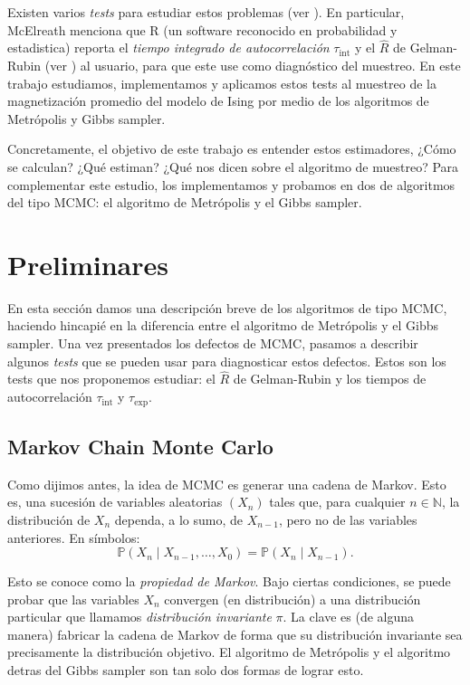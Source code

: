 \documentclass[a4paper, 12pt]{article}
\newcommand{\N}{\mathbb{N}}
\renewcommand{\P}{\mathbb{P}}
\newcommand{\tauint}{\tau_\text{int}}
\newcommand{\tauexp}{\tau_\text{exp}}
\begin{document}
Existen varios {\it tests} para estudiar estos problemas (ver \cite{vivekanada2020convergence, mcelreath2016statistical, schachinger2007mcmc}). En particular, McElreath menciona que R (un software reconocido en probabilidad y estadistica) reporta el {\it tiempo integrado de autocorrelación} $\tauint$ y el $\hat{R}$ de Gelman-Rubin (ver \cite{gelman1992inference, gelman2013bayesian}) al usuario, para que este use como diagnóstico del muestreo. En este trabajo estudiamos, implementamos y aplicamos estos tests al muestreo de la magnetización promedio del modelo de Ising por medio de los algoritmos de Metrópolis y Gibbs sampler.

\newpage

Concretamente, el objetivo de este trabajo es entender estos estimadores, ¿Cómo se calculan? ¿Qué estiman? ¿Qué nos dicen sobre el algoritmo de muestreo? Para complementar este estudio, los implementamos y probamos en dos de algoritmos del tipo MCMC: el algoritmo de Metrópolis y el Gibbs sampler.

\section{Preliminares}

En esta sección damos una descripción breve de los algoritmos de tipo MCMC, haciendo hincapié en la diferencia entre el algoritmo de Metrópolis y el Gibbs sampler. Una vez presentados los defectos de MCMC, pasamos a describir algunos {\it tests} que se pueden usar para diagnosticar estos defectos. Estos son los tests que nos proponemos estudiar: el $\hat{R}$ de Gelman-Rubin y los tiempos de autocorrelación $\tauint$ y $\tauexp$.

\subsection{Markov Chain Monte Carlo}

Como dijimos antes, la idea de MCMC es generar una cadena de Markov. Esto es, una sucesión de variables aleatorias $(X_n)$ tales que, para cualquier $n \in \N$, la distribución de $X_n$ dependa, a lo sumo, de $X_{n - 1}$, pero no de las variables anteriores. En símbolos:
\begin{equation*}
    \P(X_n \mid X_{n - 1}, \dots, X_0) = \P(X_n \mid X_{n - 1}).
\end{equation*}

Esto se conoce como la {\it propiedad de Markov}. Bajo ciertas condiciones, se puede probar que las variables $X_n$ convergen (en distribución) a una distribución particular que llamamos {\it distribución invariante} $\pi$. La clave es (de alguna manera) fabricar la cadena de Markov de forma que su distribución invariante sea precisamente la distribución objetivo. El algoritmo de Metrópolis y el algoritmo detras del Gibbs sampler son tan solo dos formas de lograr esto.\\
\end{document}
